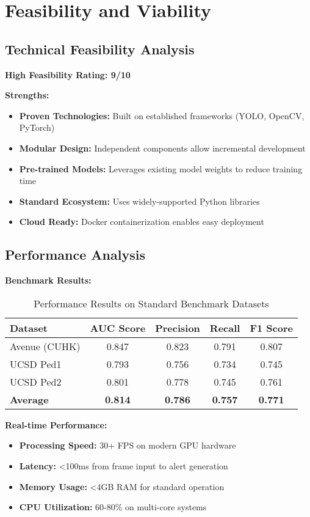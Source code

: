 \documentclass[12pt,a4paper]{article}
\begin{document}
\section{Feasibility and Viability}

\subsection{Technical Feasibility Analysis}

\textbf{High Feasibility Rating: 9/10}

\textbf{Strengths:}
\begin{itemize}
    \item \textbf{Proven Technologies:} Built on established frameworks (YOLO, OpenCV, PyTorch)
    \item \textbf{Modular Design:} Independent components allow incremental development
    \item \textbf{Pre-trained Models:} Leverages existing model weights to reduce training time
    \item \textbf{Standard Ecosystem:} Uses widely-supported Python libraries
    \item \textbf{Cloud Ready:} Docker containerization enables easy deployment
\end{itemize}

\subsection{Performance Analysis}

\textbf{Benchmark Results:}
\begin{table}[H]
\centering
\begin{tabular}{@{}lcccc@{}}
\toprule
\textbf{Dataset} & \textbf{AUC Score} & \textbf{Precision} & \textbf{Recall} & \textbf{F1 Score} \\
\midrule
Avenue (CUHK) & 0.847 & 0.823 & 0.791 & 0.807 \\
UCSD Ped1 & 0.793 & 0.756 & 0.734 & 0.745 \\
UCSD Ped2 & 0.801 & 0.778 & 0.745 & 0.761 \\
\textbf{Average} & \textbf{0.814} & \textbf{0.786} & \textbf{0.757} & \textbf{0.771} \\
\bottomrule
\end{tabular}
\caption{Performance Results on Standard Benchmark Datasets}
\label{tab:performance}
\end{table}

\textbf{Real-time Performance:}
\begin{itemize}
    \item \textbf{Processing Speed:} 30+ FPS on modern GPU hardware
    \item \textbf{Latency:} <100ms from frame input to alert generation
    \item \textbf{Memory Usage:} <4GB RAM for standard operation
    \item \textbf{CPU Utilization:} 60-80\% on multi-core systems
\end{itemize}
\end{document}
